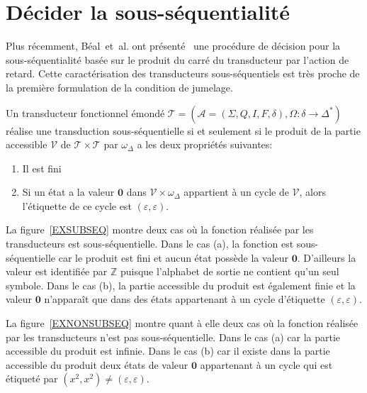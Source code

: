 \section{Décider la sous-séquentialité}
    
    Plus récemment, Béal~et~al. ont présenté~\cite{Bea03} une procédure de décision pour la sous-séquentialité basée sur le produit du carré du transducteur par l'action de retard. Cette caractérisation des transducteurs sous-séquentiels est très proche de la première formulation de la condition de jumelage. \\
    
    \begin{theorem}
    	\label{ss}
    	Un transducteur fonctionnel émondé $\mathscr{T} = (\mathscr{A} = (\Sigma,Q,I,F,\delta), \Omega:\delta\to\Delta^*)$ réalise une transduction sous-séquentielle si et seulement si le produit de la partie accessible $\mathscr{V}$ de $\mathscr{T} \times \mathscr{T}$ par $\omega_\Delta$ a les deux propriétés suivantes:
    	\begin{enumerate}
    		\item Il est fini
    		\item Si un état a la valeur $\mathbf{0}$ dans $\mathscr{V} \times \omega_\Delta$ appartient à un cycle de $\mathscr{V}$, alors l'étiquette de ce cycle est $(\varepsilon,\varepsilon)$.
    	\end{enumerate}
    \end{theorem}
    
    
    
	La figure~\ref{EXSUBSEQ} montre deux cas où la fonction réalisée par les transducteurs est sous-séquentielle. Dans le cas (a), la fonction est sous-séquentielle car le produit est fini et aucun état possède la valeur $\mathbf{0}$. D'ailleurs la valeur est identifiée par $\mathbb{Z}$ puisque l'alphabet de sortie ne contient qu'un seul symbole. Dans le cas (b), la partie accessible du produit est également finie et la valeur $\mathbf{0}$ n'apparaît que dans des états appartenant à un cycle d'étiquette $(\varepsilon,\varepsilon)$.
	
	
	    
	La figure~\ref{EXNONSUBSEQ} montre quant à elle deux cas où la fonction réalisée par les transducteurs n'est pas sous-séquentielle. Dans le cas (a) car la partie accessible du produit est infinie. Dans le cas (b) car il existe dans la partie accessible du produit deux états de valeur $\mathbf{0}$ appartenant à un cycle qui est étiqueté par $(x^2,x^2) \neq (\varepsilon,\varepsilon)$.
    

